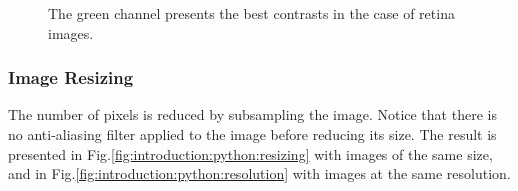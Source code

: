 \begin{figure}[H]
 \centering\caption{The green channel presents the best contrasts in the case of retina images.}%
 \hfill
 \hfill
 \hfill
 \label{fig:introduction:python:channels}%
 \vspace*{-10pt}%
\end{figure}


\subsubsection{Image Resizing}
The number of pixels is reduced by subsampling the image. Notice that there is no anti-aliasing filter applied to the image before reducing its size. The result is presented in Fig.\ref{fig:introduction:python:resizing} with images of the same size, and in Fig.\ref{fig:introduction:python:resolution} with images at the same resolution.

